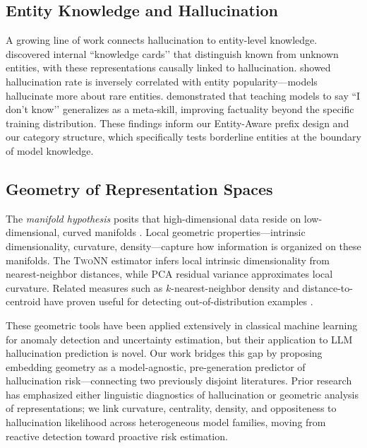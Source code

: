 \documentclass{article}
\begin{document}
\subsection{Entity Knowledge and Hallucination}

A growing line of work connects hallucination to entity-level knowledge. \citet{ferrando2024knowledge} discovered internal ``knowledge cards’’ that distinguish known from unknown entities, with these representations causally linked to hallucination. \citet{sun2024entity} showed hallucination rate is inversely correlated with entity popularity---models hallucinate more about rare entities. \citet{zhang2023rtuning} demonstrated that teaching models to say ``I don’t know’’ generalizes as a meta-skill, improving factuality beyond the specific training distribution. These findings inform our Entity-Aware prefix design and our category structure, which specifically tests borderline entities at the boundary of model knowledge.

\subsection{Geometry of Representation Spaces}

The \textit{manifold hypothesis} posits that high-dimensional data reside on low-dimensional, curved manifolds \citep{bengio2013representation}. Local geometric properties---intrinsic dimensionality, curvature, density---capture how information is organized on these manifolds. The \textsc{TwoNN} estimator \citep{facco2017twonn} infers local intrinsic dimensionality from nearest-neighbor distances, while PCA residual variance approximates local curvature. Related measures such as $k$-nearest-neighbor density and distance-to-centroid have proven useful for detecting out-of-distribution examples \citep{hendrycks2017baseline}.

These geometric tools have been applied extensively in classical machine learning for anomaly detection and uncertainty estimation, but their application to LLM hallucination prediction is novel. Our work bridges this gap by proposing embedding geometry as a model-agnostic, pre-generation predictor of hallucination risk---connecting two previously disjoint literatures. Prior research has emphasized either linguistic diagnostics of hallucination or geometric analysis of representations; we link curvature, centrality, density, and oppositeness to hallucination likelihood across heterogeneous model families, moving from reactive detection toward proactive risk estimation.
\end{document}
